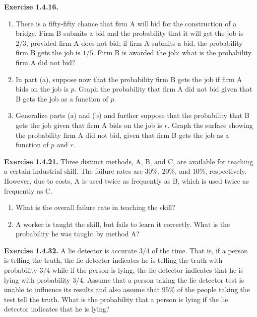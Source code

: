 \documentclass{article}
\theoremstyle{remark}
\newlength{\subsecindent}
\newenvironment{secbody}{%
  \begin{list}{}{%
    \setlength{\leftmargin}{\subsecindent}%
    \setlength{\rightmargin}{0pt}%
    \setlength{\topsep}{0pt}%
    \setlength{\partopsep}{0pt}%
    \setlength{\parsep}{\parskip}%
    \setlength{\itemsep}{\parskip}%
  }\item\relax
}{\end{list}}
\begin{document}
\begin{secbody}
\bigskip
\textbf{Exercise 1.4.16.}
\begin{enumerate}
  \item[(a)] There is a fifty-fifty chance that firm A will bid for the
             construction of a bridge. Firm B submits a bid and the
             probability that it will get the job is $2/3$, provided
             firm A does not bid; if firm A submits a bid, the
             probability firm B gets the job is $1/5$. Firm B is
             awarded the job; what is the probability firm A did not
             bid?
  \item[(b)] In part (a), suppose now that the probability firm B gets
             the job if firm A bids on the job is $p$. Graph the
             probability that firm A did not bid given that B gets the
             job as a function of $p$.
  \item[(c)] Generalize parts (a) and (b) and further suppose that the
             probability that B gets the job given that firm A bids on
             the job is $r$. Graph the surface showing the probability
             firm A did not bid, given that firm B gets the job as a
             function of $p$ and $r$.
\end{enumerate}

\bigskip
\textbf{Exercise 1.4.21.} \;
Three distinct methods, A, B, and C, are available for teaching a
certain industrial skill. The failure rates are $30\%$, $20\%$, and
$10\%$, respectively. However, due to costs, A is used twice as
frequently as B, which is used twice as frequently as C.
\begin{enumerate}
  \item[(a)] What is the overall failure rate in teaching the skill?
  \item[(b)] A worker is taught the skill, but fails to learn it
             correctly. What is the probability he was taught by
             method A?
\end{enumerate}

\bigskip
\textbf{Exercise 1.4.32.} \;
A lie detector is accurate $3/4$ of the time. That is, if a person is
telling the truth, the lie detector indicates he is telling the truth
with probability $3/4$ while if the person is lying, the lie detector
indicates that he is lying with probability $3/4$. Assume that a person
taking the lie detector test is unable to influence its results and also
assume that $95\%$ of the people taking the test tell the truth. What is
the probability that a person is lying if the lie detector indicates
that he is lying?

\end{secbody}
\end{document}
